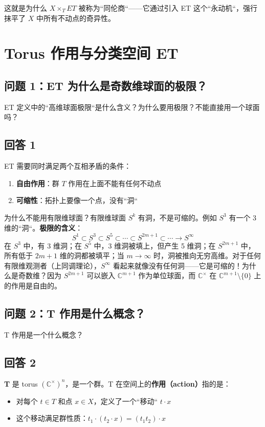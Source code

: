 这就是为什么 $X \times_T ET$ 被称为``同伦商``——它通过引入 ET 这个``永动机``，强行抹平了 $X$ 中所有不动点的奇异性。
\section{Torus 作用与分类空间 ET}\label{sec:TorusAction}
\subsection{问题 1：ET 为什么是奇数维球面的极限？}ET 定义中的``高维球面极限``是什么含义？为什么要用极限？不能直接用一个球面吗？
\subsection{回答 1}ET 需要同时满足两个互相矛盾的条件：
\begin{enumerate}
\item \textbf{自由作用}：群 $T$ 作用在上面不能有任何不动点
\item \textbf{可缩性}：拓扑上要像一个点，没有``洞``
\end{enumerate}为什么不能用有限维球面？有限维球面 $S^k$ 有洞，不是可缩的。例如 $S^3$ 有一个 3 维的``洞``。\textbf{极限的含义}：$$S^1 \subset S^3 \subset S^5 \subset \cdots \subset S^{2m+1} \subset \cdots \to S^\infty$$在 $S^3$ 中，有 3 维洞；在 $S^5$ 中，3 维洞被填上，但产生 5 维洞；在 $S^{2m+1}$ 中，所有低于 $2m+1$ 维的洞都被填平；当 $m \to \infty$ 时，洞被推向无穷高维。对于任何有限维观测者（上同调理论），$S^\infty$ 看起来就像没有任何洞——它是可缩的！为什么是奇数维？因为 $S^{2m+1}$ 可以嵌入 $\mathbb{C}^{m+1}$ 作为单位球面，而 $\mathbb{C}^\times$ 在 $\mathbb{C}^{m+1} \setminus \{0\}$ 上的作用是自由的。
\subsection{问题 2：T 作用是什么概念？}T 作用是一个什么概念？
\subsection{回答 2}\textbf{T} 是 torus $(\mathbb{C}^\times)^n$，是一个群。T 在空间上的\textbf{作用（action）}指的是：
\begin{itemize}
\item 对每个 $t \in T$ 和点 $x \in X$，定义了一个``移动`` $t \cdot x$
\item 这个移动满足群性质：$t_1 \cdot (t_2 \cdot x) = (t_1 t_2) \cdot x$
\end{itemize}

